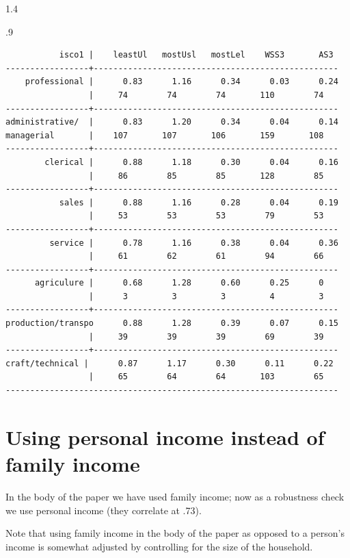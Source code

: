 \documentclass[10pt, letterpaper]{article}
\begin{document}
\begin{spacing}{1.4}
\begin{scriptsize}
\begin{spacing}{.9}
\begin{verbatim}
           isco1 |    leastUl   mostUsl   mostLel    WSS3       AS3
-----------------+--------------------------------------------------
    professional |      0.83      1.16      0.34      0.03      0.24
                 |     74        74        74       110        74   
-----------------+--------------------------------------------------
administrative/  |      0.83      1.20      0.34      0.04      0.14
managerial       |    107       107       106       159       108   
-----------------+--------------------------------------------------
        clerical |      0.88      1.18      0.30      0.04      0.16
                 |     86        85        85       128        85   
-----------------+--------------------------------------------------
           sales |      0.88      1.16      0.28      0.04      0.19
                 |     53        53        53        79        53   
-----------------+--------------------------------------------------
         service |      0.78      1.16      0.38      0.04      0.36
                 |     61        62        61        94        66   
-----------------+--------------------------------------------------
      agriculure |      0.68      1.28      0.60      0.25      0   
                 |      3         3         3         4         3   
-----------------+--------------------------------------------------
production/transpo      0.88      1.28      0.39      0.07      0.15
                 |     39        39        39        69        39   
-----------------+--------------------------------------------------
craft/technical |      0.87      1.17      0.30      0.11      0.22
                 |     65        64        64       103        65   
--------------------------------------------------------------------
\end{verbatim}
\end{spacing}
\end{scriptsize}




\section{Using personal income instead of family income}

In the body of the paper we have used family income; now as a robustness check
we use personal income (they correlate at .73). 

Note that using family income in the body of the paper as opposed to a person's
income is somewhat adjusted by controlling for the size of the household. 


\end{spacing}
\end{document}
